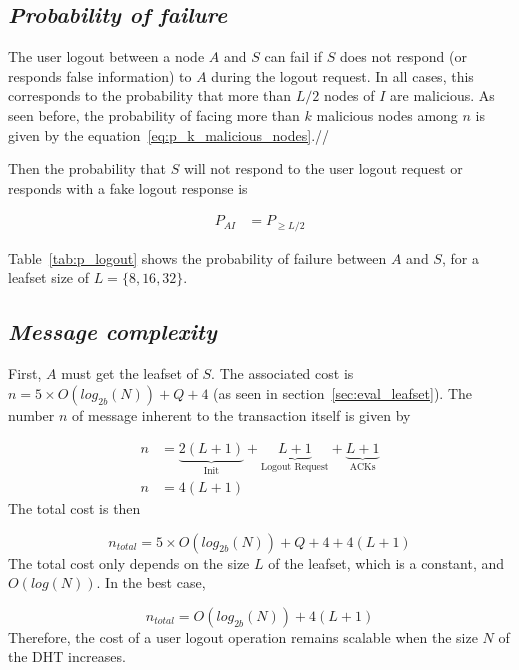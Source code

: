   \subsection{\textit{Probability of failure}}
    The user logout between a node $A$ and $S$ can fail if $S$ does
not respond (or responds false information) to $A$ during the logout request.
  In all cases, this corresponds to the probability that more than
$L/2$ nodes of $I$ are malicious.
    As seen before, the probability of facing more than $k$ malicious nodes among
$n$ is given by the equation~\ref{eq:p_k_malicious_nodes}.//

    Then the probability that $S$ will not respond to the user logout 
request or responds with a fake logout response is

    \begin{align}
      P_{AI} &= P_{\ge L/2} 
    \end{align}


    Table~\eqref{tab:p_logout} shows the probability of failure
between $A$ and $S$, for a leafset size of $L = \{8,16,32\}$.

    
  \subsection{\textit{Message complexity}}
    First, $A$ must get the leafset of $S$. The associated cost is $n = 5
\times O(log_{2b}(N)) + Q + 4$ (as seen in section~\ref{sec:eval_leafset}).
    The number $n$ of message inherent to the transaction itself is given by

    \begin{align}
      n &= \underbrace{2(L+1)}_\text{Init} +  \underbrace{L+1}_\text{Logout Request} + \underbrace{L+1}_\text{ACKs}\\
      n &= 4(L+1)
    \end{align}
     The total cost is then

    $$
      n_{total} = 5 \times O(log_{2b}(N)) + Q + 4 + 4(L+1)
    $$    
    The total cost only depends on the size $L$ of the leafset, which is a
constant, and $O(log(N))$. In the best case, 

    $$
      n_{total} = O(log_{2b}(N)) + 4(L+1)
    $$
    Therefore, the cost of a user logout operation remains scalable when the size $N$ of the DHT increases.

